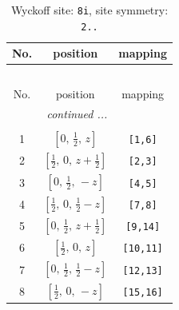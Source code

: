 \documentclass[fleqn,8pt]{jsarticle}
\begin{document}
\renewcommand{\arraystretch}{1.2}
\begin{longtable}{ccc}
\caption{Wyckoff site: {\tt 8i}, site symmetry: {\tt 2..}}
 \\
 \hline \hline
No. & position & mapping \\ \hline \endfirsthead

\multicolumn{2}{l}{\tablename\ \thetable{}} \\
 \hline \hline
No. & position & mapping \\ \hline \endhead

 \hline \hline
\multicolumn{2}{r}{\footnotesize\it continued ...} \\ \endfoot

 \hline \hline
\multicolumn{2}{r}{} \\ \endlastfoot

1 & $\left[ 0,\, \frac{1}{2},\, z \right]$ & {\tt [1,6]} \\ \hline
2 & $\left[ \frac{1}{2},\, 0,\, z + \frac{1}{2} \right]$ & {\tt [2,3]} \\ \hline
3 & $\left[ 0,\, \frac{1}{2},\, - z \right]$ & {\tt [4,5]} \\ \hline
4 & $\left[ \frac{1}{2},\, 0,\, \frac{1}{2} - z \right]$ & {\tt [7,8]} \\ \hline
5 & $\left[ 0,\, \frac{1}{2},\, z + \frac{1}{2} \right]$ & {\tt [9,14]} \\ \hline
6 & $\left[ \frac{1}{2},\, 0,\, z \right]$ & {\tt [10,11]} \\ \hline
7 & $\left[ 0,\, \frac{1}{2},\, \frac{1}{2} - z \right]$ & {\tt [12,13]} \\ \hline
8 & $\left[ \frac{1}{2},\, 0,\, - z \right]$ & {\tt [15,16]} \\
\end{longtable}
\renewcommand{\arraystretch}{1.2}
\end{document}

